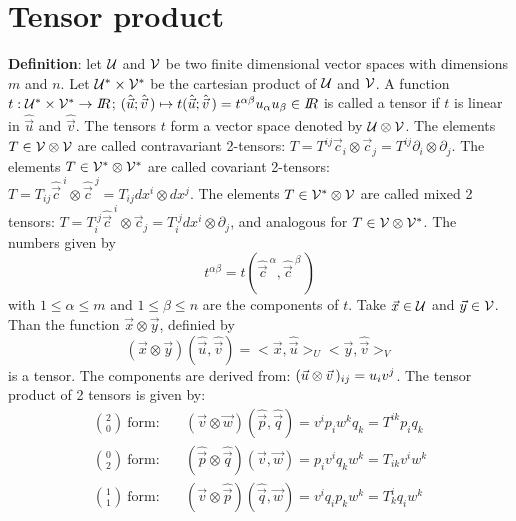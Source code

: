 \documentclass[a4paper,fancyheadings,twoside]{report}
\begin{document}
\section{Tensor product}
{\bf Definition}: let $\cal U$ and $\cal V$ be two finite dimensional vector
spaces with dimensions $m$ and $n$. Let $\cal U^*\times V^*$ be the cartesian
product of $\cal U$ and $\cal V$. A function $t:{\cal U^*\times V^*}\rightarrow I\hspace{-1mm}R$;
$(\hat{\vec{u}};\hat{\vec{v}}\,)\mapsto t(\hat{\vec{u}};\hat{\vec{v}}\,)=t^{\alpha\beta}u_\alpha u_\beta\in I\hspace{-1mm}R$
is called a tensor if $t$ is linear in $\hat{\vec{u}}$ and $\hat{\vec{v}}$.
The tensors $t$ form a vector space denoted by $\cal U\otimes V$.
The elements $T\in\cal V\otimes V$ are called contravariant 2-tensors:
$T=T^{ij}\vec{c}_i\otimes\vec{c}_j=T^{ij}\partial_i\otimes\partial_j$. The
elements $T\in\cal V^*\otimes V^*$ are called covariant 2-tensors:
$T=T_{ij}\hat{\vec{c}}^{~i}\otimes\hat{\vec{c}}^{~j}=T_{ij}dx^i\otimes dx^j$.
The elements $T\in\cal V^*\otimes V$ are called mixed 2 tensors:
$T=T_i^{.j}\hat{\vec{c}}^{~i}\otimes\vec{c}_j=T_i^{.j}dx^i\otimes\partial_j$,
and analogous for $T\in\cal V\otimes V^*$.
\npar
The numbers given by
\[
t^{\alpha\beta}=t(\hat{\vec{c}}^{~\alpha},\hat{\vec{c}}^{~\beta}\,)
\]
with $1\leq\alpha\leq m$ and $1\leq\beta\leq n$ are the components of $t$.
\npar
Take $\vec{x}\in\cal U$ and $\vec{y}\in\cal V$. Than the function
$\vec{x}\otimes\vec{y}$, definied by
\[
(\vec{x}\otimes\vec{y})(\hat{\vec{u}},\hat{\vec{v}})=<\vec{x},\hat{\vec{u}}>_U<\vec{y},\hat{\vec{v}}>_V
\]
is a tensor. The components are derived from: $(\vec{u}\otimes\vec{v}\,)_{ij}=u_iv^j$.
The tensor product of 2 tensors is given by:
\begin{eqnarray*}
{2\choose0}~\mbox{form:}~&&(\vec{v}\otimes\vec{w})(\hat{\vec{p}},\hat{\vec{q}})=v^ip_iw^kq_k=T^{ik}p_iq_k\\
{0\choose2}~\mbox{form:}~&&(\hat{\vec{p}}\otimes\hat{\vec{q}})(\vec{v},\vec{w})=p_iv^iq_kw^k=T_{ik}v^iw^k\\
{1\choose1}~\mbox{form:}~&&(\vec{v}\otimes\hat{\vec{p}})(\hat{\vec{q}},\vec{w})=v^iq_ip_kw^k=T_k^iq_iw^k
\end{eqnarray*}
\end{document}
